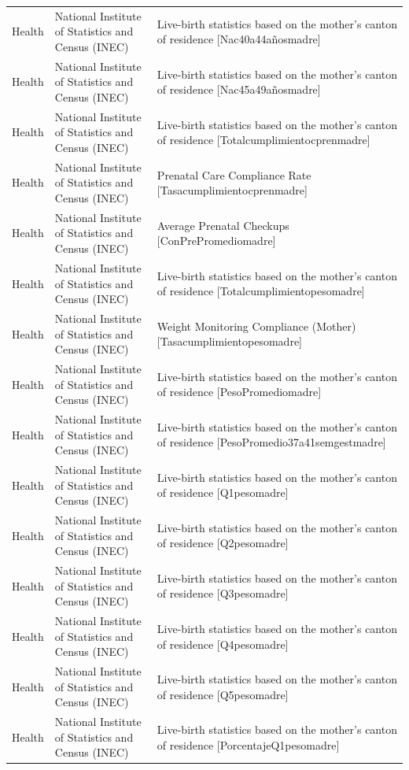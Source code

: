 \documentclass[10pt,a4paper]{article}
\begin{document}
\begin{longtable}{@{}>{\raggedright\arraybackslash}p{3.5cm}>{\raggedright\arraybackslash}p{5.6cm}>{\raggedright\arraybackslash}p{\dimexpr\textwidth-9.1cm-4\tabcolsep\relax}@{}}
Health & National Institute of Statistics and Census (INEC) & Live-birth statistics based on the mother's canton of residence [Nac40a44a\~{n}osmadre]\\
Health & National Institute of Statistics and Census (INEC) & Live-birth statistics based on the mother's canton of residence [Nac45a49a\~{n}osmadre]\\
Health & National Institute of Statistics and Census (INEC) & Live-birth statistics based on the mother's canton of residence [Totalcumplimientocprenmadre]\\
Health & National Institute of Statistics and Census (INEC) & Prenatal Care Compliance Rate [Tasacumplimientocprenmadre]\\
Health & National Institute of Statistics and Census (INEC) & Average Prenatal Checkups [ConPrePromediomadre]\\
Health & National Institute of Statistics and Census (INEC) & Live-birth statistics based on the mother's canton of residence [Totalcumplimientopesomadre]\\
Health & National Institute of Statistics and Census (INEC) & Weight Monitoring Compliance (Mother) [Tasacumplimientopesomadre]\\
Health & National Institute of Statistics and Census (INEC) & Live-birth statistics based on the mother's canton of residence [PesoPromediomadre]\\
Health & National Institute of Statistics and Census (INEC) & Live-birth statistics based on the mother's canton of residence [PesoPromedio37a41semgestmadre]\\
Health & National Institute of Statistics and Census (INEC) & Live-birth statistics based on the mother's canton of residence [Q1pesomadre]\\
Health & National Institute of Statistics and Census (INEC) & Live-birth statistics based on the mother's canton of residence [Q2pesomadre]\\
Health & National Institute of Statistics and Census (INEC) & Live-birth statistics based on the mother's canton of residence [Q3pesomadre]\\
Health & National Institute of Statistics and Census (INEC) & Live-birth statistics based on the mother's canton of residence [Q4pesomadre]\\
Health & National Institute of Statistics and Census (INEC) & Live-birth statistics based on the mother's canton of residence [Q5pesomadre]\\
Health & National Institute of Statistics and Census (INEC) & Live-birth statistics based on the mother's canton of residence [PorcentajeQ1pesomadre]\\

\end{longtable}
\end{document}
